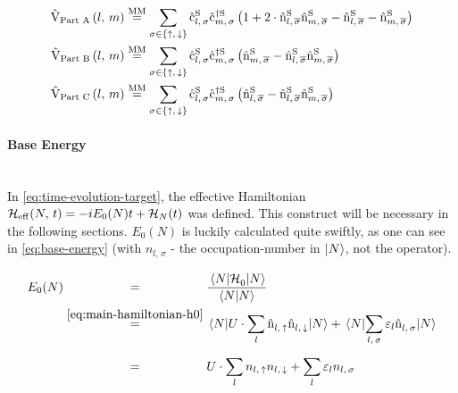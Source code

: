 \begin{equation}
    \label{eq:interaction-picture-v-ham-parts-simplified}
    \begin{split}
        \VhamiltonianPartA{l}{m} &\stackrel{\text{MM}}{=} 
        \lsum[\sigma \in \left\{\up,\,\down\right\}]
        \withspinop[\schroedingerPicture]{l}{\sigma}{}\withspinop[\schroedingerPicture]{m}{\sigma}{\dagger}
        \left(
            1+
            2 \cdot \nop[\schroedingerPicture]{l}{\overline{\sigma}}\nop[\schroedingerPicture]{m}{\overline{\sigma}}
            - \nop[\schroedingerPicture]{l}{\overline{\sigma}}
            - \nop[\schroedingerPicture]{m}{\overline{\sigma}}
        \right)
        \\
        \VhamiltonianPartB{l}{m} &\stackrel{\text{MM}}{=} 
        \lsum[\sigma \in \left\{\up,\,\down\right\}]        
        \withspinop[\schroedingerPicture]{l}{\sigma}{}\withspinop[\schroedingerPicture]{m}{\sigma}{\dagger}
        \left(
            \nop[\schroedingerPicture]{m}{\overline{\sigma}}
            - \nop[\schroedingerPicture]{l}{\overline{\sigma}}\nop[\schroedingerPicture]{m}{\overline{\sigma}}
        \right)
        \\
        \VhamiltonianPartC{l}{m} &\stackrel{\text{MM}}{=} 
        \lsum[\sigma \in \left\{\up,\,\down\right\}]
        \withspinop[\schroedingerPicture]{l}{\sigma}{}\withspinop[\schroedingerPicture]{m}{\sigma}{\dagger}
        \left(
            \nop[\schroedingerPicture]{l}{\overline{\sigma}}
            - \nop[\schroedingerPicture]{l}{\overline{\sigma}}\nop[\schroedingerPicture]{m}{\overline{\sigma}}
        \right)
        \\
    \end{split}
\end{equation}

\paragraph*{Base Energy}\makebox{}\\

In \autoref{eq:time-evolution-target}, the effective Hamiltonian ${\mathcal{H}_\text{eff}}^{}({N},\,t) = -i E_0(N) t + \mathcal{H}_{N}(t)$ was defined.
This construct will be necessary in the following sections. 
$E_0(N)$ is luckily calculated quite swiftly, as one can see in \autoref{eq:base-energy} (with $n_{l,\,\sigma}$ - the occupation-number in $\ket{N}$, not the operator).

\begin{equation}
    \label{eq:base-energy}
    \begin{split}
        E_0(N) &\stackrel{\phantom{\ref{eq:main-hamiltonian-h0}}}{=} \frac{\bracketHelper{N}{\HzeroHamiltonian[]}{N}}{\braketHelper{N}{N}} \\
        &\stackrel{\ref{eq:main-hamiltonian-h0}}{=} \bracketHelper{N}{U \cdot \lsum \nop{l}{\up}\nop{l}{\down}}{N} + \bracketHelper{N}{\lsum[l,\,\sigma] \epsl \nop{l}{\sigma}}{N}\\
        &\stackrel{\phantom{\ref{eq:main-hamiltonian-h0}}}{=} U \cdot \lsum n_{l,\,\up}n_{l,\,\down} + \lsum \epsl n_{l,\,\sigma}
    \end{split}
\end{equation}

